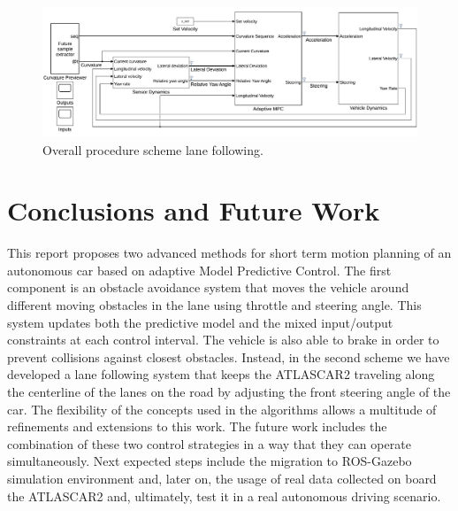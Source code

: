 \documentclass[conference,11pt]{IEEEtran}
\begin{document}
\begin{figure}[!b]
	\centering
	\includegraphics[width=1\textwidth]{./figure/lane_following_AMPC.pdf}
	\caption{Overall procedure scheme lane following.}
	\label{fig:scheme_lane_following}
\end{figure}
\section{Conclusions and Future Work}
This report proposes two advanced methods for short term motion planning of an autonomous car based on adaptive Model Predictive Control. The first component is an obstacle avoidance system that moves the vehicle around different moving obstacles in the lane using throttle and steering angle. This system updates both the predictive model and the mixed input/output constraints at each control interval. The vehicle is also able to brake in order to prevent collisions against closest obstacles. Instead, in the second scheme  we have developed a lane following system that keeps the ATLASCAR2 traveling along the centerline of the lanes on the road by adjusting the front steering angle of the car.  The flexibility of the concepts used in the algorithms allows a multitude of refinements and extensions to this work. The future work includes the combination of these two control strategies in a way that they can operate simultaneously. Next expected steps include the migration to ROS-Gazebo simulation environment and, later on, the usage of real data collected on board the ATLASCAR2 and, ultimately, test it in a real autonomous driving scenario.


\balance
\end{document}
